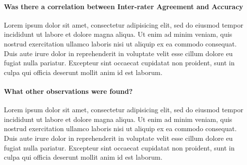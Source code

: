 \paragraph{Was there a correlation between Inter-rater Agreement and Accuracy}
Lorem ipsum dolor sit amet, consectetur adipisicing elit, sed do eiusmod tempor incididunt ut labore et dolore magna aliqua. Ut enim ad minim veniam, quis nostrud exercitation ullamco laboris nisi ut aliquip ex ea commodo consequat. Duis aute irure dolor in reprehenderit in voluptate velit esse cillum dolore eu fugiat nulla pariatur. Excepteur sint occaecat cupidatat non proident, sunt in culpa qui officia deserunt mollit anim id est laborum.

\paragraph{What other observations were found?}
Lorem ipsum dolor sit amet, consectetur adipisicing elit, sed do eiusmod tempor incididunt ut labore et dolore magna aliqua. Ut enim ad minim veniam, quis nostrud exercitation ullamco laboris nisi ut aliquip ex ea commodo consequat. Duis aute irure dolor in reprehenderit in voluptate velit esse cillum dolore eu fugiat nulla pariatur. Excepteur sint occaecat cupidatat non proident, sunt in culpa qui officia deserunt mollit anim id est laborum.